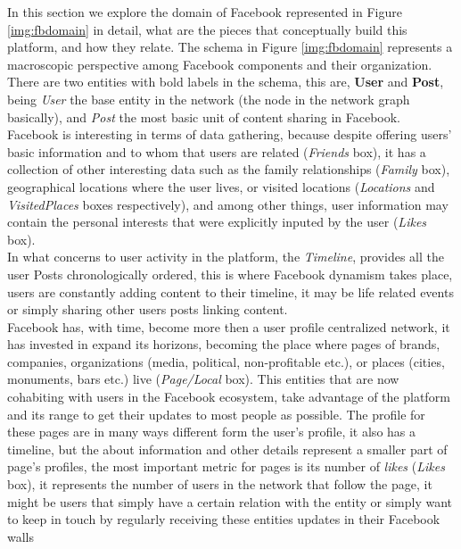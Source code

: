 \indent In this section we explore the domain of Facebook represented in Figure \ref{img:fbdomain} in detail, what are the pieces that conceptually build
this platform, and how they relate. The schema in Figure \ref{img:fbdomain} represents a macroscopic perspective among Facebook components and their organization.\\
\indent There are two entities with bold labels in the schema, this are, \textbf{User} and \textbf{Post}, being
\textit{User} the base entity in the network (the node in the network graph basically), and \textit{Post} the most basic unit of content sharing in Facebook.\\
\indent Facebook is interesting in terms of data gathering, because despite offering users' basic information
and to whom that users are related (\textit{Friends} box), it has a collection of other interesting data
such as the family relationships (\textit{Family} box), geographical locations where the user lives, or
visited locations (\textit{Locations} and \textit{VisitedPlaces} boxes respectively), and among other things, user information
may contain the personal interests that were explicitly inputed by the user (\textit{Likes} box).\\
\indent In what concerns to user activity in the platform, the \textit{Timeline}, provides all the user
Posts chronologically ordered, this is where Facebook dynamism takes place, users are constantly
adding content to their timeline, it may be life related events or simply sharing other users posts linking content.\\
\indent Facebook has, with time, become more then a user profile centralized network, it has invested in expand its horizons, becoming
the place where pages of brands, companies, organizations (media, political, non-profitable etc.), or places (cities, monuments, bars etc.) live (\textit{Page/Local} box).
This entities that are now cohabiting with users in the Facebook ecosystem, take advantage of the platform and its range to get their updates to most people as possible. The profile
for these pages are in many ways different form the user's profile, it also has a timeline, but the about information and other details represent a smaller part of page's profiles,
the most important metric for pages is its number of \textit{likes} (\textit{Likes} box), it represents the number of users in the network that follow the page, it might be users
that simply have a certain relation with the entity or simply want to keep in touch by regularly receiving these entities updates in their Facebook walls
